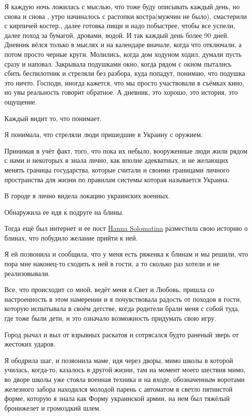
Я каждую ночь ложилась с мыслью, что тоже буду описывать каждый день, но снова
и снова , утро начиналось с растопки костра(мужчин не было), смастерили с
кирпичей костер., далее готовка пищи и надо побыстрее, чтобы все успели, далее
поход за бумагой, дровами, водой. И так каждый день более 90 дней. Дневник
вёлся только в мыслях и на календаре вначале, когда что отключали, а потом
просто черные круги. Молились, когда дом ходуном ходил, думали пусть сразу и
наповал. Закрывала подушками окно, когда рядом с окном пытались сбить
беспилотник и стреляли без разбора, куда попадут, понимаю, что подушка это
ничто. Господи, иногда кажется, что мы просто участвовали в съёмках кино, но
увы реальность говорит обратное. А дневник, это хорошо, это история, это
ощущение.


Каждый видит то, что понимает.

Я понимала, что стреляли люди пришедшие в Украину с оружием.

Принимая в учёт факт, того, что пока их небыло, вооруженные люди жили рядом с
нами и некоторых я знала лично, как вполне адекватных, и не желающих менять
границы государства, которые считали и своими границами личного пространства
для жизни по правилам системы которая называется Украина.

В городе я лично видела локацию украинских военных.

Обнаружила ее идя к подруге на блины.

Тогда ещё был интернет и ее пост
\href{https://www.facebook.com/profile.php?id=100023852258613}{Hanna
Solomatina} разместила свою историю о блинах, что побудило желание прийти к
ней.

Я ей позвонила и сообщила, что у меня есть ряженка к блинам и мы решили, что
пора мне наконец-то сходить к ней в гости, а то сколько раз хотели и не
реализовывали.

Все, что происходит со мной, ведёт меня в Свет и Любовь, пришла со
настроенность в этом намерении и я почувствовала радость от походов в гости,
которую испытывала в своём детстве, когда родители брали меня с собой туда, где
тоже были дети, и это означало возможность придумать свою игру.

Город рычал и выл от взрывных раскатов и сотрясался будто раненый зверь от
жестоких ударов.

Я ободрила шаг, и позвонила маме, идя через дворы, мимо школы в которой
училась, когда-то, казалось в другой жизни, там на момент моего шествия мимо, во
дворе школы уже стояла военная техника и на входе, обозначенным воротами
железного забора находился молодой парень с автоматом в светло пятнистой форме,
которую я знала как Форму украинской армии, на нем был тяжёлый бронижелет и
громоздкий шлем. 

